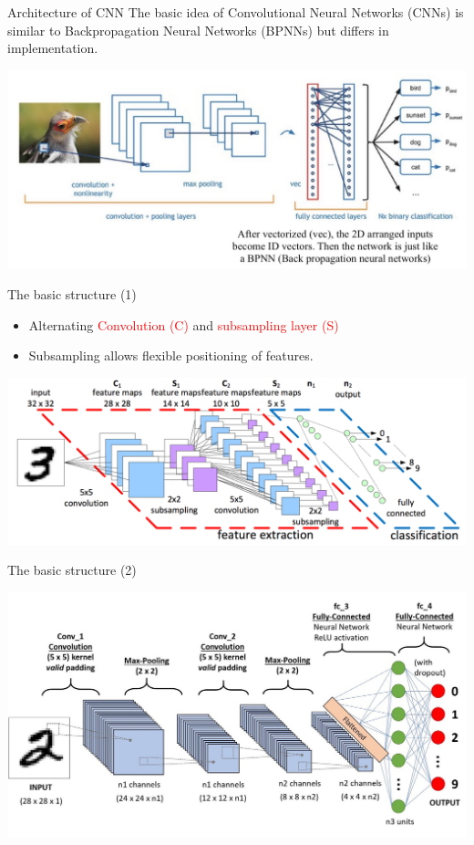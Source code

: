 \documentclass[default, aspectratio=169]{beamer}
\begin{document}
	\begin{frame}{Architecture of CNN}
		\centering
		The basic idea of Convolutional Neural Networks (CNNs) is similar to Backpropagation Neural Networks (BPNNs) but differs in implementation.
		
		\includegraphics[keepaspectratio, scale=0.5]{pic/Architecture_of_CNN.jpg}
	\end{frame}
	\begin{frame}{The basic structure (1)}
		\begin{itemize}
			\item Alternating \textcolor{red}{Convolution (C)} and \textcolor{red}{subsampling layer (S)}
			\item Subsampling allows flexible positioning of features.
		\end{itemize}
		\begin{center}
			\includegraphics[keepaspectratio, scale=0.23]{pic/CNN_structure_3.png}
		\end{center}
	\end{frame}
	\begin{frame}{The basic structure (2)}
		\begin{center}
			\includegraphics[keepaspectratio, scale=0.25]{pic/CNN_structure_a.jpeg}
		\end{center}
	\end{frame}
\end{document}
